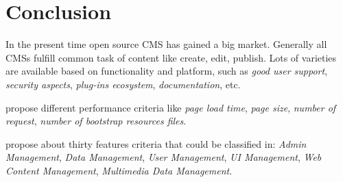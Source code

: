 \section{Conclusion}\label{sec:conclusions}

In the present time open source CMS has gained a big market. 
Generally all CMSs fulfill common task of content like create, edit, publish. 
Lots of varieties are available based on functionality and platform, such as \emph{good user support}, \emph{security aspects}, \emph{plug-ins ecosystem}, \emph{documentation}, etc.

\cite{6169111} propose different performance criteria like \emph{page load time}, \emph{page size}, \emph{number of request}, \emph{number of bootstrap resources files}.
 
\cite{5552271} propose about thirty features criteria that could be classified in: \emph{Admin Management}, \emph{Data Management}, \emph{User Management}, \emph{UI Management}, \emph{Web Content Management}, \emph{Multimedia Data Management}.
